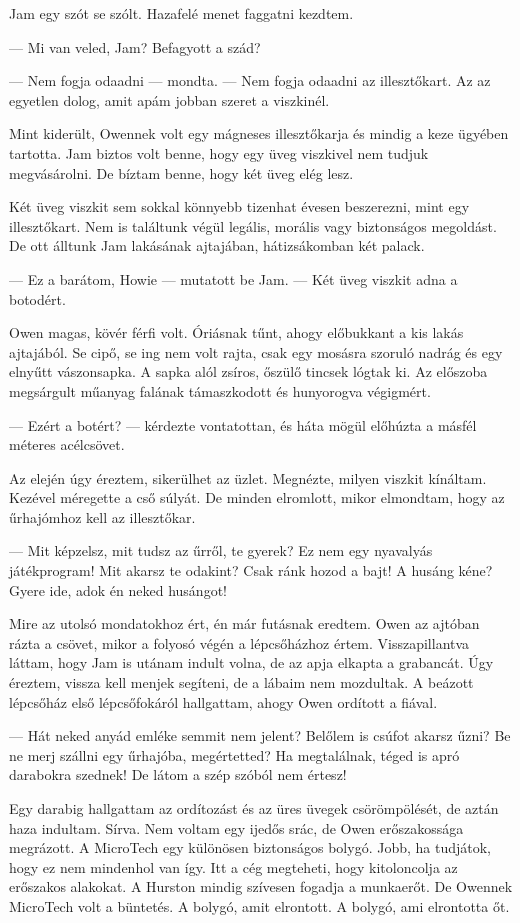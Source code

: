 \documentclass[10pt]{memoir}
\begin{document}
Jam egy szót se szólt. Hazafelé menet faggatni kezdtem.

--- Mi van veled, Jam? Befagyott a szád?

--- Nem fogja odaadni --- mondta. --- Nem fogja odaadni az illesztőkart. Az az
egyetlen dolog, amit apám jobban szeret a viszkinél.

Mint kiderült, Owennek volt egy mágneses illesztőkarja és mindig a keze ügyében
tartotta. Jam biztos volt benne, hogy egy üveg viszkivel nem tudjuk
megvásárolni. De bíztam benne, hogy két üveg elég lesz.

Két üveg viszkit sem sokkal könnyebb tizenhat évesen beszerezni, mint egy
illesztőkart. Nem is találtunk végül legális, morális vagy biztonságos
megoldást. De ott álltunk Jam lakásának ajtajában, hátizsákomban két palack.

--- Ez a barátom, Howie --- mutatott be Jam. --- Két üveg viszkit adna a
botodért.

Owen magas, kövér férfi volt. Óriásnak tűnt, ahogy előbukkant a kis lakás
ajtajából. Se cipő, se ing nem volt rajta, csak egy mosásra szoruló nadrág és
egy elnyűtt vászonsapka. A sapka alól zsíros, őszülő tincsek lógtak ki. Az
előszoba megsárgult műanyag falának támaszkodott és hunyorogva végigmért.

--- Ezért a botért? --- kérdezte vontatottan, és háta mögül előhúzta a másfél
méteres acélcsövet.

Az elején úgy éreztem, sikerülhet az üzlet. Megnézte, milyen viszkit kínáltam.
Kezével méregette a cső súlyát. De minden elromlott, mikor elmondtam, hogy az
űrhajómhoz kell az illesztőkar.

--- Mit képzelsz, mit tudsz az űrről, te gyerek? Ez nem egy nyavalyás
játékprogram! Mit akarsz te odakint? Csak ránk hozod a bajt! A husáng kéne?
Gyere ide, adok én neked husángot!

Mire az utolsó mondatokhoz ért, én már futásnak eredtem. Owen az ajtóban rázta
a csövet, mikor a folyosó végén a lépcsőházhoz értem. Visszapillantva láttam,
hogy Jam is utánam indult volna, de az apja elkapta a grabancát. Úgy éreztem,
vissza kell menjek segíteni, de a lábaim nem mozdultak. A beázott lépcsőház
első lépcsőfokáról hallgattam, ahogy Owen ordított a fiával.

--- Hát neked anyád emléke semmit nem jelent? Belőlem is csúfot akarsz űzni? Be
ne merj szállni egy űrhajóba, megértetted? Ha megtalálnak, téged is apró
darabokra szednek! De látom a szép szóból nem értesz!

Egy darabig hallgattam az ordítozást és az üres üvegek csörömpölését, de aztán
haza indultam. Sírva. Nem voltam egy ijedős srác, de Owen erőszakossága
megrázott. A MicroTech egy különösen biztonságos bolygó. Jobb, ha tudjátok,
hogy ez nem mindenhol van így. Itt a cég megteheti, hogy kitoloncolja az
erőszakos alakokat. A Hurston mindig szívesen fogadja a munkaerőt. De Owennek
MicroTech volt a büntetés. A bolygó, amit elrontott. A bolygó, ami elrontotta
őt.
\end{document}
